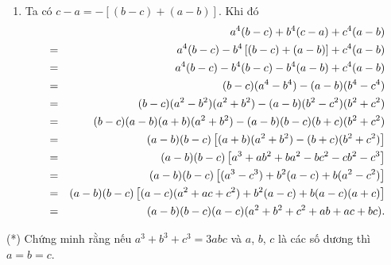 \begin{bt}
{\begin{enumerate}
	\item Ta có $c-a=-\left[(b-c)+(a-b)\right]$. Khi đó
	\allowdisplaybreaks
	\begin{eqnarray*}
		&	&a^4(b-c)+b^4(c-a)+c^4(a-b)\notag\\
		&= &a^4(b-c)-b^4\left[(b-c)+(a-b)\right]+c^4(a-b)\notag\\
		&= &a^4(b-c)-b^4(b-c)-b^4(a-b)+c^4(a-b)\notag\\
		&= &(b-c)(a^4-b^4)-(a-b)(b^4-c^4)\notag\\
		&= &(b-c)(a^2-b^2)(a^2+b^2)-(a-b)(b^2-c^2)(b^2+c^2)\notag\\
		&= &(b-c)(a-b)(a+b)(a^2+b^2)-(a-b)(b-c)(b+c)(b^2+c^2)\notag\\
		&= &(a-b)(b-c)\left[(a+b)(a^2+b^2)-(b+c)(b^2+c^2)\right]\notag\\
		&= &(a-b)(b-c)\left[a^3+ab^2+ba^2-bc^2-cb^2-c^3\right]\notag\\
		&= &(a-b)(b-c)\left[(a^3-c^3)+b^2(a-c)+b(a^2-c^2)\right]\notag\\
		&= &(a-b)(b-c)\left[(a-c)(a^2+ac+c^2)+b^2(a-c)+b(a-c)(a+c)\right]\notag\\
		&= &(a-b)(b-c)(a-c)(a^2+b^2+c^2+ab+ac+bc).\notag
	\end{eqnarray*}
	
\end{enumerate}
}
\end{bt}

\begin{bt}%
(*) Chứng minh rằng nếu $a^3+b^3+c^3=3abc$ và $a$, $b$, $c$ là các số dương thì $a=b=c$.
\end{bt}

